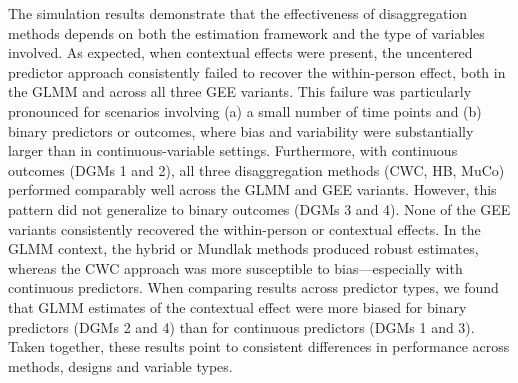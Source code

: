 \documentclass[stu]{apa7}
\begin{document}
The simulation results demonstrate that the effectiveness of disaggregation methods depends on both the estimation framework and the type of variables involved. As expected, when contextual effects were present, the uncentered predictor approach consistently failed to recover the within-person effect, both in the GLMM and across all three GEE variants. This failure was particularly pronounced for scenarios involving (a) a small number of time points and (b) binary predictors or outcomes, where bias and variability were substantially larger than in continuous-variable settings. Furthermore, with continuous outcomes (DGMs 1 and 2), all three disaggregation methods (CWC, HB, MuCo) performed comparably well across the GLMM and GEE variants. However, this pattern did not generalize to binary outcomes (DGMs 3 and 4). None of the GEE variants consistently recovered the within-person or contextual effects. In the GLMM context, the hybrid or Mundlak methods produced robust estimates, whereas the CWC approach was more susceptible to bias—especially with continuous predictors. When comparing results across predictor types, we found that GLMM estimates of the contextual effect were more biased for binary predictors (DGMs 2 and 4) than for continuous predictors (DGMs 1 and 3). Taken together, these results point to consistent differences in performance across methods, designs and variable types.


\end{document}
